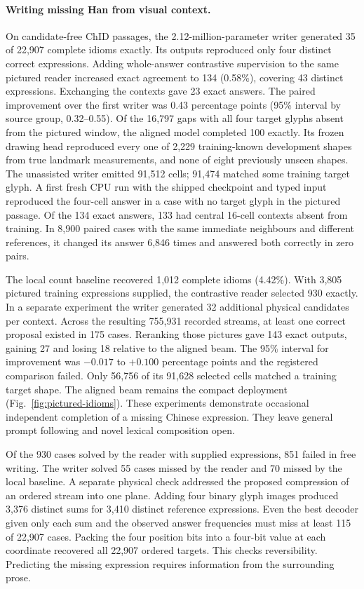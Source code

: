 \paragraph{Writing missing Han from visual context.}
On candidate-free ChID passages, the 2.12-million-parameter writer
generated 35 of 22,907 complete idioms exactly. Its outputs reproduced
only four distinct correct expressions. Adding whole-answer contrastive
supervision to the same pictured reader increased exact agreement to 134
(0.58\%), covering 43 distinct expressions. Exchanging the contexts gave
23 exact answers. The paired improvement over the first writer was 0.43
percentage points (95\% interval by source group, 0.32--0.55).
Of the 16,797 gaps with all four target glyphs absent from the pictured
window, the aligned model completed 100 exactly. Its frozen drawing head
reproduced every one of 2,229 training-known development shapes from
true landmark measurements, and none of eight previously unseen shapes.
The unassisted writer emitted 91,512 cells; 91,474 matched some training
target glyph. A first fresh CPU run with the shipped checkpoint and
typed input reproduced the four-cell answer in a case with no target glyph
in the pictured passage. Of the 134 exact answers, 133 had central 16-cell contexts
absent from training. In 8,900 paired cases with the same immediate
neighbours and different references, it changed its answer 6,846 times
and answered both correctly in zero pairs.

The local count baseline recovered 1,012 complete idioms (4.42\%).
With 3,805 pictured training expressions supplied, the contrastive reader
selected 930 exactly. In a separate experiment the writer generated
32 additional physical candidates per context. Across the resulting
755,931 recorded streams, at least one correct proposal existed in 175
cases. Reranking those pictures gave 143 exact outputs, gaining 27 and
losing 18 relative to the aligned beam. The 95\% interval for improvement
was $-0.017$ to $+0.100$ percentage points and the registered comparison
failed. Only 56,756 of its 91,628 selected cells matched a training target
shape. The aligned beam remains the compact deployment
(Fig.~\ref{fig:pictured-idioms}). These experiments demonstrate occasional
independent completion of a missing Chinese expression. They leave
general prompt following and novel lexical composition open.

Of the 930 cases solved by the reader with supplied expressions, 851
failed in free writing. The writer solved 55 cases missed by the reader
and 70 missed by the local baseline. A separate physical check addressed
the proposed compression of an ordered stream into one plane. Adding
four binary glyph images produced 3,376 distinct sums for 3,410 distinct
reference expressions. Even the best decoder given only each sum and the
observed answer frequencies must miss at least 115 of 22,907 cases.
Packing the four position bits into a four-bit value at each coordinate
recovered all 22,907 ordered targets. This checks reversibility. Predicting
the missing expression requires information from the surrounding prose.
